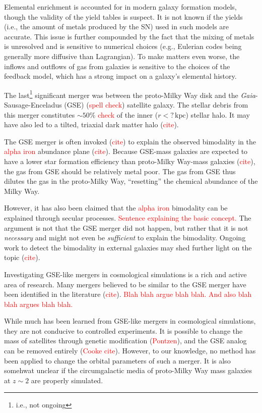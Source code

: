 \documentclass[linenumbers, twocolumn]{aastex631}
\newcommand{\kpc}{\ensuremath{\textrm{kpc}}}
\begin{document}
Elemental enrichment is accounted for in modern galaxy formation models, though the validity of the yield tables is suspect. It is not known if the yields (i.e., the amount of metals produced by the SN) used in such models are accurate. This issue is further compounded by the fact that the mixing of metals is unresolved and is sensitive to numerical choices (e.g., Eulerian codes being generally more diffusive than Lagrangian). To make matters even worse, the inflows and outflows of gas from galaxies is sensitive to the choices of the feedback model, which has a strong impact on a galaxy's elemental history.




The last\footnote{i.e., not ongoing} significant merger was between the
proto-Milky Way disk and the {\em Gaia}-Sausage-Enceladus (GSE)
(\textcolor{red}{spell check}) satellite galaxy. The stellar debris from this
merger constitutes $\sim50\%$ \textcolor{red}{check} of the inner ($r<?\,\kpc$)
stellar halo. It may have also led to a tilted, triaxial dark matter halo
(\textcolor{red}{cite}).

The GSE merger is often invoked (\textcolor{red}{cite}) to explain the observed
bimodality in the \textcolor{red}{alpha iron} abundance plane
(\textcolor{red}{cite}). Because GSE-mass galaxies are expected to have a lower
star formation efficiency than proto-Milky Way-mass galaxies
(\textcolor{red}{cite}), the gas from GSE should be relatively metal poor. The
gas from GSE thus dilutes the gas in the proto-Milky Way, ``resetting'' the
chemical abundance of the Milky Way.

However, it has also been claimed that the \textcolor{red}{alpha iron}
bimodality can be explained through secular processes. \textcolor{red}{Sentence
explaining the basic concept.} The argument is not that the GSE merger did not
happen, but rather that it is not {\it necessary} and might not even be {\it
sufficient} to explain the bimodality. Ongoing work to detect the bimodality in
external galaxies may shed further light on the topic (\textcolor{red}{cite}).

Investigating GSE-like mergers in cosmological simulations is a rich and active
area of research. Many mergers believed to be similar to the GSE merger have
been identified in the literature (\textcolor{red}{cite}). \textcolor{red}{Blah
blah argue blah blah. And also blah blah argues blah blah.}

While much has been learned from GSE-like mergers in cosmological simulations,
they are not conducive to controlled experiments. It is possible to change the
mass of satellites through genetic modification (\textcolor{red}{Pontzen}), and
the GSE analog can be removed entirely (\textcolor{red}{Cooke cite}). However,
to our knowledge, no method has been applied to change the orbital parameters of
such a merger. It is also somehwat unclear if the circumgalactic media of
proto-Milky Way mass galaxies at $z\sim2$ are properly simulated.
\end{document}
